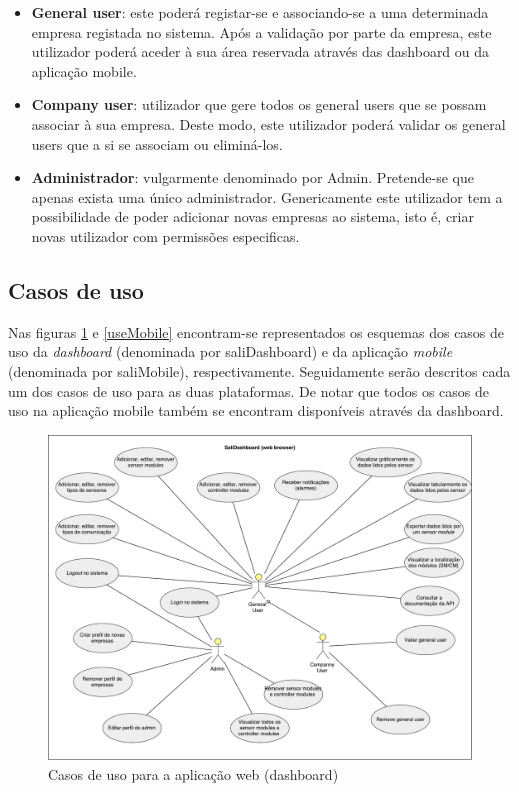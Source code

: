 \begin{itemize}
	
	\item \textbf{General user}: este poderá registar-se e associando-se a uma determinada empresa registada no sistema. Após a validação por parte da empresa, este utilizador poderá aceder à sua área reservada através das dashboard ou da aplicação mobile. 
	
	\item \textbf{Company user}: utilizador que gere todos os general users que se possam associar à sua empresa. Deste modo, este utilizador poderá validar os general users que a si se associam ou eliminá-los.  
	
	\item \textbf{Administrador}: vulgarmente denominado por Admin. Pretende-se que apenas exista uma único administrador. Genericamente este utilizador tem a possibilidade de poder adicionar novas empresas ao sistema, isto é, criar novas utilizador com permissões especificas. 
	
\end{itemize}




\subsection{Casos de uso}


Nas figuras \ref{usedash} e \ref{useMobile} encontram-se representados os esquemas dos casos de uso da \textit{dashboard} (denominada por saliDashboard) e da aplicação \textit{mobile} (denominada por saliMobile), respectivamente.
Seguidamente serão descritos cada um dos casos de uso para as duas plataformas. De notar que todos os casos de uso na aplicação mobile também se encontram disponíveis através da dashboard. 


\begin{figure}[!htb]
	\centering
	\includegraphics[width=\linewidth]{esquemas/use-case-web.pdf}
	\caption{Casos de uso para a aplicação web (dashboard) }
	\label{usedash}
\end{figure}


